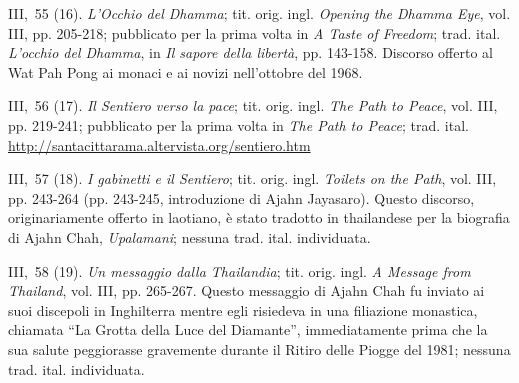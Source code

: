 III,~55 (16). \emph{L'Occhio del Dhamma}; tit. orig. ingl. \emph{Opening
the Dhamma Eye}, vol. III, pp. 205-218; pubblicato per la prima volta in
\emph{A Taste of Freedom}; trad. ital. \emph{L'occhio del Dhamma}, in
\emph{Il sapore della libertà}, pp. 143-158. Discorso offerto al Wat Pah
Pong ai monaci e ai novizi nell'ottobre del 1968.

III,~56 (17). \emph{Il Sentiero verso la pace}; tit. orig. ingl.
\emph{The Path to Peace}, vol. III, pp. 219-241; pubblicato per la prima
volta in \emph{The Path to Peace}; trad. ital.
\url{http://santacittarama.altervista.org/sentiero.htm}

III,~57 (18). \emph{I gabinetti e il Sentiero}; tit. orig. ingl.
\emph{Toilets on the Path}, vol. III, pp. 243-264 (pp. 243-245,
introduzione di Ajahn Jayasaro). Questo discorso, originariamente
offerto in laotiano, è stato tradotto in thailandese per la biografia di
Ajahn Chah, \emph{Upalamani}; nessuna trad. ital. individuata.

III,~58 (19). \emph{Un messaggio dalla Thailandia}; tit. orig. ingl.
\emph{A Message from Thailand}, vol. III, pp. 265-267. Questo messaggio
di Ajahn Chah fu inviato ai suoi discepoli in Inghilterra mentre egli
risiedeva in una filiazione monastica, chiamata ``La Grotta della Luce
del Diamante'', immediatamente prima che la sua salute peggiorasse
gravemente durante il Ritiro delle Piogge del 1981; nessuna trad. ital.
individuata.

